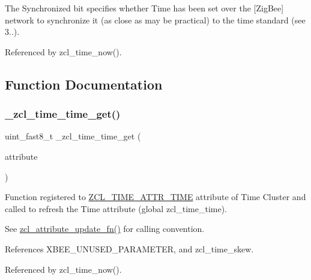 The Synchronized bit specifies whether Time has been set over the \mbox{[}Zig\+Bee\mbox{]} network to synchronize it (as close as may be practical) to the time standard (see 3..). 



Referenced by zcl\+\_\+time\+\_\+now().



\subsection{Function Documentation}
\mbox{\label{group__zcl__time_ga9c0749b71318a4f7fd28d9112ffd5462}} 
\subsubsection{\texorpdfstring{\+\_\+zcl\+\_\+time\+\_\+time\+\_\+get()}{\_zcl\_time\_time\_get()}}
{\footnotesize\ttfamily uint\+\_\+fast8\+\_\+t \+\_\+zcl\+\_\+time\+\_\+time\+\_\+get (\begin{DoxyParamCaption}\item[{const \hyperlink{structzcl__attribute__full__t}{zcl\+\_\+attribute\+\_\+full\+\_\+t} \hyperlink{group__hal_gaef060b3456fdcc093a7210a762d5f2ed}{F\+AR} $\ast$}]{attribute }\end{DoxyParamCaption})}



Function registered to \hyperlink{group__zcl__time_ga6abf0e2cc70ac533ebe153a40185be63}{Z\+C\+L\+\_\+\+T\+I\+M\+E\+\_\+\+A\+T\+T\+R\+\_\+\+T\+I\+ME} attribute of Time Cluster and called to refresh the Time attribute (global zcl\+\_\+time\+\_\+time). 

See \hyperlink{group__zcl_gace94cfc3f22379fa08a5b8de8c6977f6}{zcl\+\_\+attribute\+\_\+update\+\_\+fn()} for calling convention. 

References X\+B\+E\+E\+\_\+\+U\+N\+U\+S\+E\+D\+\_\+\+P\+A\+R\+A\+M\+E\+T\+ER, and zcl\+\_\+time\+\_\+skew.



Referenced by zcl\+\_\+time\+\_\+now().

\mbox{\label{group__zcl__time_ga052b988d6d2448af6640028b45ee1f68}} 
